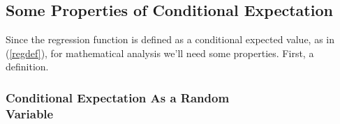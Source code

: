 % 
% 
% 
% 
% 
% 
% 

\subsection{Some Properties of Conditional Expectation}
\label{conditexpectprops}

Since the regression function is defined as a conditional expected
value, as in (\ref{regdef}), for mathematical analysis we'll need some
properties. First, a definition.

\subsubsection{Conditional Expectation As a Random \\ Variable}

